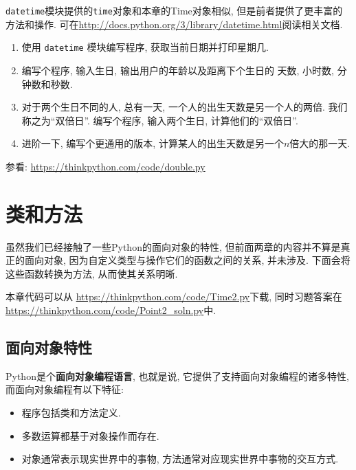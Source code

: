 \documentclass[10pt]{book}
\begin{document}
\begin{exercise}

{\tt datetime}模块提供的{\tt time}对象和本章的Time对象相似, 
但是前者提供了更丰富的方法和操作. 
可在\url{http://docs.python.org/3/library/datetime.html}阅读相关文档.

\begin{enumerate}

\item 使用 {\tt datetime} 模块编写程序, 获取当前日期并打印星期几. 

\item 编写个程序, 输入生日, 输出用户的年龄以及距离下个生日的
天数, 小时数, 分钟数和秒数. 

\item 对于两个生日不同的人, 
总有一天, 一个人的出生天数是另一个人的两倍. 
我们称之为``双倍日''.
编写个程序, 输入两个生日, 计算他们的``双倍日''.

\item 进阶一下, 编写个更通用的版本, 计算某人的出生天数是另一个$n$倍大的那一天. 

\end{enumerate}

参看: \url{https://thinkpython.com/code/double.py}

\end{exercise}


\chapter{类和方法}

虽然我们已经接触了一些Python的面向对象的特性, 
但前面两章的内容并不算是真正的面向对象, 
因为自定义类型与操作它们的函数之间的关系, 并未涉及. 
下面会将这些函数转换为方法, 从而使其关系明晰. 

本章代码可以从
\url{https://thinkpython.com/code/Time2.py}下载, 
同时习题答案在\url{https://thinkpython.com/code/Point2_soln.py}中.


\section{面向对象特性}

Python是个{\bf 面向对象编程语言}, 
也就是说, 它提供了支持面向对象编程的诸多特性, 而面向对象编程有以下特征:

\begin{itemize}

\item 程序包括类和方法定义.

\item 多数运算都基于对象操作而存在. 

\item 对象通常表示现实世界中的事物, 方法通常对应现实世界中事物的交互方式. 

\end{itemize}
\end{document}
